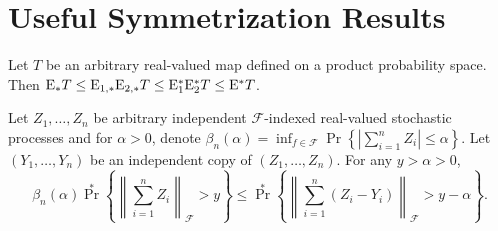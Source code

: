 
\section{Useful Symmetrization Results}

\begin{lemma}
\label{lem--vdvw23-lem-1-2-6}
Let \(T\) be an arbitrary real-valued map defined on a product probability
space.
Then \(\mathrm{E}_{\ast} T \leq \mathrm{E}_{1, \ast} \mathrm{E}_{2, \ast} T \leq \mathrm{E}_{1}^{\ast}
\mathrm{E}_{2}^{\ast} T \leq \mathrm{E}^{\ast} T\).
\end{lemma}

\begin{lemma}
\label{lem--symm-1}
Let \(Z_{1}, \dots, Z_{n}\) be arbitrary independent \(\mathcal{F}\)-indexed
real-valued stochastic processes and for \(\alpha > 0\), denote
\(\beta_{n} (\alpha) = \inf_{f \in \mathcal{F}} \Pr \left\{ \left|
\sum_{i = 1}^{n} Z_{i} \right| \leq \alpha \right\}\).
Let \(\left( Y_{1}, \dots, Y_{n} \right)\) be an independent copy of \(\left(
Z_{1}, \dots, Z_{n} \right)\).
For any \(y > \alpha > 0\),
\begin{equation}
  \beta_{n} (\alpha) \Pr^{\ast} \left\{ \left\| \sum_{i = 1}^{n} Z_{i}
  \right\|_{\mathcal{F}} > y \right\} \leq
  \Pr^{\ast} \left\{ \left\| \sum_{i = 1}^{n} \left( Z_{i} - Y_{i} \right)
  \right\|_{\mathcal{F}} > y - \alpha \right\}.
  \label{eqn--symm-1}
\end{equation}
\end{lemma}

